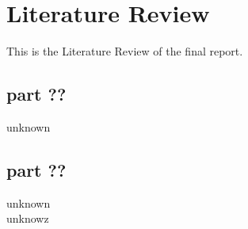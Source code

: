 \section{Literature Review} 
This is the Literature Review of the final report.
\subsection{part ??}
unknown
\subsection{part ??}
unknown \\
unknowz

\newpage